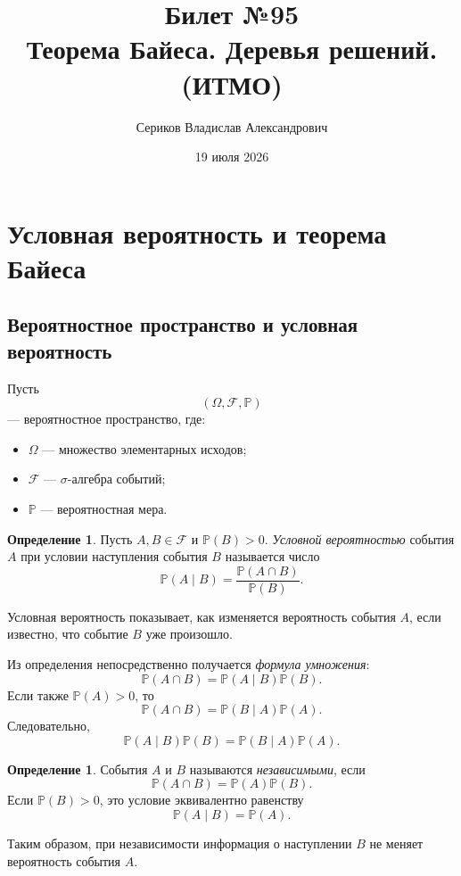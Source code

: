 \documentclass[12pt,a4paper]{article}
\title{Билет №95 \\ \small Теорема Байеса. Деревья решений. (ИТМО)}
\author{Сериков Владислав Александрович}
\date{19 июля 2026}
\theoremstyle{plain}
\theoremstyle{definition}
\newtheorem{definition}[theorem]{Определение}
\theoremstyle{remark}
\newcommand{\Pp}{\mathbb{P}}
\begin{document}
\maketitle
\tableofcontents
\newpage

\section{Условная вероятность и теорема Байеса}

\subsection{Вероятностное пространство и условная вероятность}

Пусть
\[
    (\Omega,\mathcal{F},\Pp)
\]
--- вероятностное пространство, где:
\begin{itemize}
    \item $\Omega$ --- множество элементарных исходов;
    \item $\mathcal{F}$ --- $\sigma$-алгебра событий;
    \item $\Pp$ --- вероятностная мера.
\end{itemize}

\begin{definition}
Пусть $A,B\in\mathcal{F}$ и $\Pp(B)>0$. \emph{Условной вероятностью}
события $A$ при условии наступления события $B$ называется число
\[
    \Pp(A\mid B)
    =
    \frac{\Pp(A\cap B)}{\Pp(B)}.
\]
\end{definition}

Условная вероятность показывает, как изменяется вероятность события $A$,
если известно, что событие $B$ уже произошло.

Из определения непосредственно получается \emph{формула умножения}:
\[
    \Pp(A\cap B)
    =
    \Pp(A\mid B)\Pp(B).
\]
Если также $\Pp(A)>0$, то
\[
    \Pp(A\cap B)
    =
    \Pp(B\mid A)\Pp(A).
\]
Следовательно,
\[
    \Pp(A\mid B)\Pp(B)
    =
    \Pp(B\mid A)\Pp(A).
\]

\begin{definition}
События $A$ и $B$ называются \emph{независимыми}, если
\[
    \Pp(A\cap B)=\Pp(A)\Pp(B).
\]
Если $\Pp(B)>0$, это условие эквивалентно равенству
\[
    \Pp(A\mid B)=\Pp(A).
\]
\end{definition}

Таким образом, при независимости информация о наступлении $B$ не меняет
вероятность события $A$.
\end{document}
